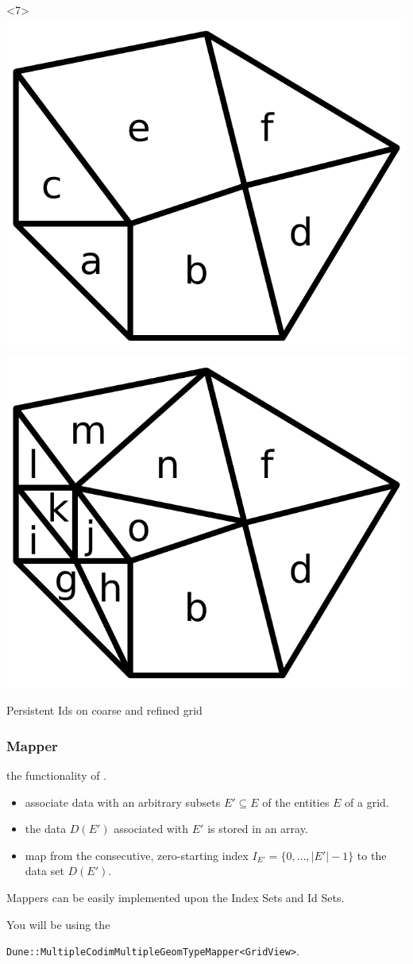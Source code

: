 \documentclass[aspectratio=169,11pt]{beamer}
\theoremstyle{definition}
\begin{document}
\begin{frame}
\begin{overlayarea}{\linewidth}{0.45\linewidth}
\begin{center}
    \begin{onlyenv}<7>
      \includegraphics[width=0.4\linewidth]{index-id0}
      \hfill
      \includegraphics[width=0.4\linewidth]{index-id1}\par
      Persistent Ids on coarse and refined grid\par
    \end{onlyenv}

    \end{center}
  \end{overlayarea}
\end{frame}

\begin{frame} \frametitle{Mapper}
   the functionality of .

  \medskip
  \begin{itemize}
  \item associate data with an arbitrary subsets $E'\subseteq E$
    of the entities $E$ of a grid.
  \item the data $D(E')$ associated with
    $E'$ is stored in an array.
  \item map from the consecutive, zero-starting index $I_{E'} =
    \{0, \ldots, |E'|-1\}$ to the data set $D(E')$.
  \end{itemize}

  \medskip
  Mappers can be easily implemented upon the Index Sets and Id Sets.

  \pause \medskip
  You will be using the

  \centering
  \lstinline!Dune::MultipleCodimMultipleGeomTypeMapper<GridView>!.
\end{frame}
\end{document}

